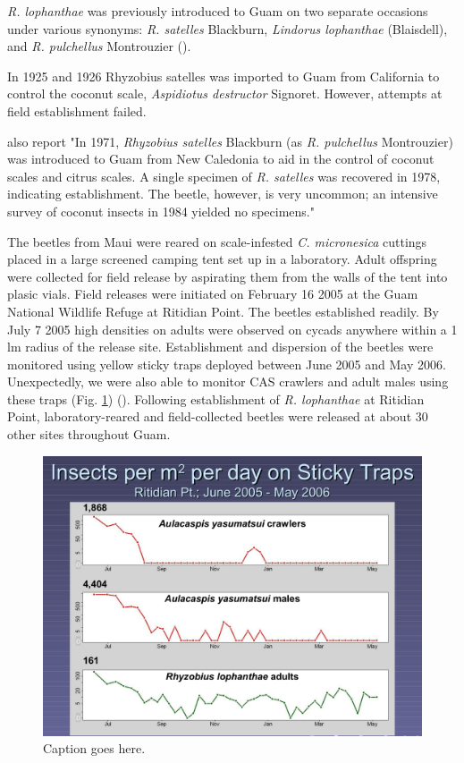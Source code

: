 \documentclass[12pt,letterpaper,english,bibliography=totocnumbered, abstract=on]{scrartcl}
\begin{document}
\textit{R. lophanthae} was previously introduced to Guam on two separate occasions under various synonyms: \textit{R. satelles} Blackburn, \textit{Lindorus lophanthae} (Blaisdell), and \textit{R. pulchellus} Montrouzier (\cite{nafus_biological_1989}). 

In 1925 and 1926 Rhyzobius satelles was imported to Guam from California to control the coconut scale, \textit{Aspidiotus destructor} Signoret. However, attempts at field establishment failed.  

\cite{nafus_biological_1989} also report "In 1971, \textit{Rhyzobius satelles} Blackburn (as \textit{R. pulchellus} Montrouzier) was introduced to Guam from New Caledonia to aid in the control of coconut scales and citrus scales. A single specimen of \textit{R. satelles} was recovered in 1978, indicating establishment. The beetle, however, is very uncommon; an intensive survey of coconut insects in 1984 yielded no specimens."

The beetles from Maui were reared on scale-infested \textit{C. micronesica} cuttings placed in a large screened camping tent set up in a laboratory. Adult offspring were collected for field release by aspirating them from the walls of the tent into plasic vials. Field releases were initiated on February 16 2005 at the Guam National Wildlife Refuge at Ritidian Point. The beetles established readily. By July 7 2005 high densities on adults were observed on cycads anywhere within a 1 lm radius of the release site.  Establishment and dispersion of the beetles were monitored using yellow sticky traps deployed between June 2005 and May 2006. Unexpectedly, we were also able to monitor CAS crawlers and adult males using these traps (Fig. \ref{fig:sticky-traps})  (\cite{moore_biological_2017-2}). Following establishment of \textit{R. lophanthae} at Ritidian Point, laboratory-reared and field-collected beetles were released at about 30 other sites throughout Guam. 

\begin{figure}[H]
	\centering
	\includegraphics[width=0.7\linewidth]{sticky-traps}
	\caption{Caption goes here.}
	\label{fig:sticky-traps}
\end{figure}
\end{document}
